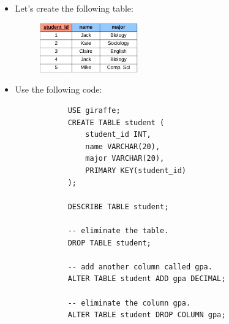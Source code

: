 \begin{itemize}
    \item Let's create the following table:
        \begin{figure}[H]
            \centering
            \includegraphics[width=0.4\textwidth]{./figs/example.png}
        \end{figure}
    
    \item Use the following code:
        \begin{verbatim}
            USE giraffe;
            CREATE TABLE student (
                student_id INT,
                name VARCHAR(20),
                major VARCHAR(20),
                PRIMARY KEY(student_id)
            );

            DESCRIBE TABLE student;

            -- eliminate the table.
            DROP TABLE student;

            -- add another column called gpa.
            ALTER TABLE student ADD gpa DECIMAL;

            -- eliminate the column gpa.
            ALTER TABLE student DROP COLUMN gpa;
        \end{verbatim}
\end{itemize}

